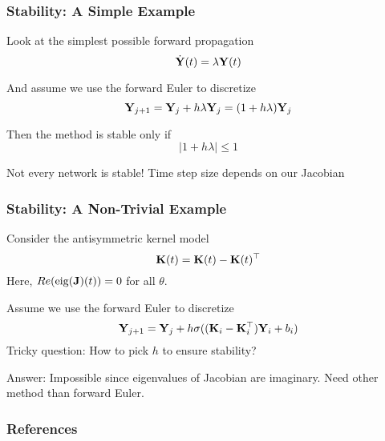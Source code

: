 \documentclass[12pt,fleqn,handout]{beamer}
\begin{document}
\begin{frame}[fragile]\frametitle{Stability: A Simple Example}

Look at the simplest possible forward propagation
$$ \dot{{\bf Y}}(t) = \lambda{\bf Y}(t) $$

And assume we use the forward Euler to discretize
$$ {\bf Y}_{j+1} = {\bf Y}_{j} + h \lambda {\bf Y}_j = (1+h\lambda) {\bf Y}_j$$

Then the method is stable only if
$$ |1+h\lambda| \le 1 $$

\bigskip

Not every network is stable! Time step size depends on our Jacobian

\end{frame}


\begin{frame}[fragile]\frametitle{Stability: A Non-Trivial Example}

Consider the antisymmetric kernel model
$$
			{\bf K}(t) = {\bf K}(t) - {\bf K}(t)^\top
$$
Here, $Re({\rm eig}({\bf J})(t))= 0$ for all $\theta$.

\bigskip
\pause
			
Assume we use the forward Euler to discretize
$$ {\bf Y}_{j+1} = {\bf Y}_{j} + h \sigma( ({\bf K}_i-{\bf K}_i^\top) {\bf Y}_i + b_i) $$
Tricky question: How to pick $h$ to ensure stability?

\pause

Answer: Impossible since eigenvalues of Jacobian are imaginary. Need other method than forward Euler.
\end{frame}

\begin{frame}[allowframebreaks]
	\frametitle{References}



\end{frame}
\end{document}
